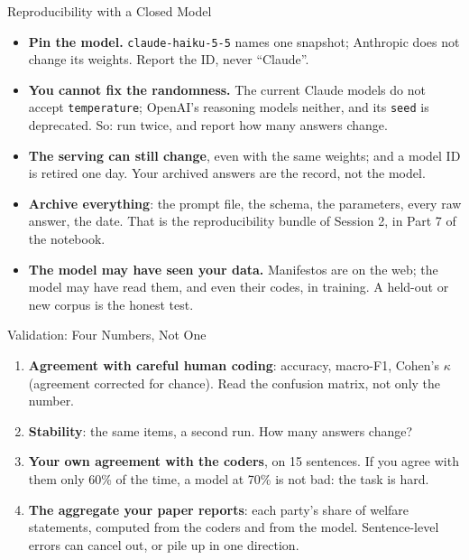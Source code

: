 \begin{frame}{Reproducibility with a Closed Model}

\small
\begin{itemize}
    \setlength{\itemsep}{6pt}
    \item \textbf{Pin the model.} \texttt{claude-haiku-5-5} names one snapshot; Anthropic does not change its weights. Report the ID, never ``Claude''.
    \item \textbf{You cannot fix the randomness.} The current Claude models do not accept \texttt{temperature}; OpenAI's reasoning models neither, and its \texttt{seed} is deprecated. So: run twice, and report how many answers change.
    \item \textbf{The serving can still change}, even with the same weights; and a model ID is retired one day. Your archived answers are the record, not the model.
    \item \textbf{Archive everything}: the prompt file, the schema, the parameters, every raw answer, the date. That is the reproducibility bundle of Session 2, in Part 7 of the notebook.
    \item \textbf{The model may have seen your data.} Manifestos are on the web; the model may have read them, and even their codes, in training. A held-out or new corpus is the honest test.
\end{itemize}

\end{frame}

\begin{frame}{Validation: Four Numbers, Not One}

\small
\begin{enumerate}
    \setlength{\itemsep}{6pt}
    \item \textbf{Agreement with careful human coding}: accuracy, macro-F1, Cohen's $\kappa$ (agreement corrected for chance). Read the confusion matrix, not only the number.
    \item \textbf{Stability}: the same items, a second run. How many answers change?
    \item \textbf{Your own agreement with the coders}, on 15 sentences. If you agree with them only 60\% of the time, a model at 70\% is not bad: the task is hard.
    \item \textbf{The aggregate your paper reports}: each party's share of welfare statements, computed from the coders and from the model. Sentence-level errors can cancel out, or pile up in one direction.
\end{enumerate}

\vspace{0.3cm}


\end{frame}

